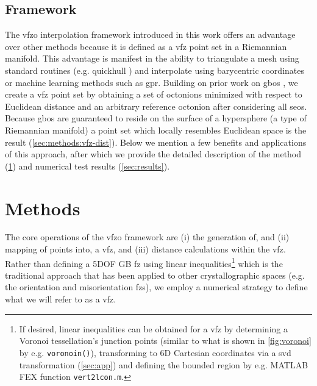\documentclass[final,twocolumn,12pt]{elsarticle}
\newcommand{\matlab}[1]{\mbox{\lstinline[style=Matlab-editor]{#1}}}
\begin{document}
\subsection{ Framework}
The \gls{vfzo} interpolation framework introduced in this work offers an advantage over other methods because it is defined as a \gls{vfz} point set in a Riemannian manifold. This advantage is manifest in the ability to triangulate a mesh using standard routines (e.g. quickhull \cite{barberQuickhullAlgorithmConvex1996}) and interpolate using barycentric coordinates or machine learning methods such as \gls{gpr}. Building on prior work on \glspl{gbo} \cite{francisGeodesicOctonionMetric2019,chesserLearningGrainBoundary2020}, we create a \gls{vfz} point set by obtaining a set of octonions minimized with respect to Euclidean distance and an arbitrary reference octonion after considering all \glspl{seo}. Because \glspl{gbo} are guaranteed to reside on the surface of a hypersphere \cite{francisGeodesicOctonionMetric2019} (a type of Riemannian manifold) a point set which locally resembles Euclidean space is the result (\cref{sec:methods:vfz-dist}). Below we mention a few benefits and applications of this approach, after which we provide the detailed description of the method (\cref{sec:methods}) and numerical test results (\cref{sec:results}).


\section{Methods} \label{sec:methods}

The core operations of the \gls{vfzo} framework are (i) the generation of, and (ii) mapping of points into, a \gls{vfz}, and (iii) distance calculations within the \gls{vfz}. Rather than defining a 5DOF GB \gls{fz} using linear inequalities\footnote{If desired, linear inequalities can be obtained for a \gls{vfz} by determining a Voronoi tessellation's junction points (similar to what is shown in \cref{fig:voronoi} by e.g. \matlab{voronoin()}), transforming to 6D Cartesian coordinates via a \gls{svd} transformation (\cref{sec:app}) and defining the bounded region by e.g. MATLAB FEX function \matlab{vert2lcon.m}.} which is the traditional approach that has been applied to other crystallographic spaces (e.g. the orientation \cite{heinzRepresentationOrientationDisorientation1991} and misorientation \cite{grimmerUniqueDescriptionRelative1980,heinzRepresentationOrientationDisorientation1991} \glspl{fz}), we employ a numerical strategy to define what we will refer to as a \gls{vfz}.
\end{document}
